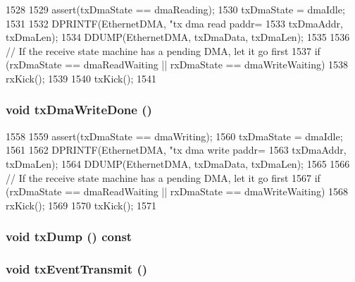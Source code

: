 \begin{DoxyCode}
1528 {
1529     assert(txDmaState == dmaReading);
1530     txDmaState = dmaIdle;
1531 
1532     DPRINTF(EthernetDMA, "tx dma read  paddr=%
1533             txDmaAddr, txDmaLen);
1534     DDUMP(EthernetDMA, txDmaData, txDmaLen);
1535 
1536     // If the receive state machine  has a pending DMA, let it go first
1537     if (rxDmaState == dmaReadWaiting || rxDmaState == dmaWriteWaiting)
1538         rxKick();
1539 
1540     txKick();
1541 }
\end{DoxyCode}
\hypertarget{classNSGigE_a1129265b8bad8421a16a980530a1184f}{
\subsubsection[{txDmaWriteDone}]{\setlength{\rightskip}{0pt plus 5cm}void txDmaWriteDone ()}}
\label{classNSGigE_a1129265b8bad8421a16a980530a1184f}



\begin{DoxyCode}
1558 {
1559     assert(txDmaState == dmaWriting);
1560     txDmaState = dmaIdle;
1561 
1562     DPRINTF(EthernetDMA, "tx dma write paddr=%
1563             txDmaAddr, txDmaLen);
1564     DDUMP(EthernetDMA, txDmaData, txDmaLen);
1565 
1566     // If the receive state machine  has a pending DMA, let it go first
1567     if (rxDmaState == dmaReadWaiting || rxDmaState == dmaWriteWaiting)
1568         rxKick();
1569 
1570     txKick();
1571 }
\end{DoxyCode}
\hypertarget{classNSGigE_afe787c5d7928546256f34b65f485be32}{
\subsubsection[{txDump}]{\setlength{\rightskip}{0pt plus 5cm}void txDump () const}}
\label{classNSGigE_afe787c5d7928546256f34b65f485be32}
\hypertarget{classNSGigE_a2b61c48d7a63b50007517c67e35dfd20}{
\subsubsection[{txEventTransmit}]{\setlength{\rightskip}{0pt plus 5cm}void txEventTransmit ()}}
\label{classNSGigE_a2b61c48d7a63b50007517c67e35dfd20}



